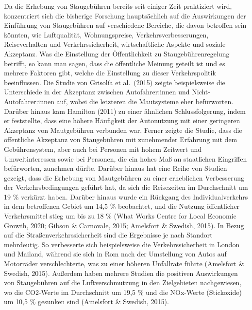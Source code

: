 \documentclass[
]{book}
\begin{document}
Da die Erhebung von Staugebühren bereits seit einiger Zeit praktiziert wird, konzentriert sich die bisherige Forschung hauptsächlich auf die Auswirkungen der Einführung von Staugebühren auf verschiedene Bereiche, die davon betroffen sein könnten, wie Luftqualität, Wohnungspreise, Verkehrsverbesserungen, Reiseverhalten und Verkehrssicherheit, wirtschaftliche Aspekte und soziale Akzeptanz.
Was die Einstellung der Öffentlichkeit zu Staugebührenregelung betrifft, so kann man sagen, dass die öffentliche Meinung geteilt ist und es mehrere Faktoren gibt, welche die Einstellung zu dieser Verkehrspolitik beeinflussen. Die Studie von Grisolía et al.~(2015) zeigte beispielsweise die Unterschiede in der Akzeptanz zwischen Autofahrer:innen und Nicht-Autofahrer:innen auf, wobei die letzteren die Mautsysteme eher befürworten. Darüber hinaus kam Hamilton (2011) zu einer ähnlichen Schlussfolgerung, indem er feststellte, dass eine höhere Häufigkeit der Autonutzung mit einer geringeren Akzeptanz von Mautgebühren verbunden war. Ferner zeigte die Studie, dass die öffentliche Akzeptanz von Staugebühren mit zunehmender Erfahrung mit dem Gebührensystem, aber auch bei Personen mit hohem Zeitwert und Umweltinteressen sowie bei Personen, die ein hohes Maß an staatlichen Eingriffen befürworten, zunehmen dürfte.
Darüber hinaus hat eine Reihe von Studien gezeigt, dass die Erhebung von Mautgebühren zu einer erheblichen Verbesserung der Verkehrsbedingungen geführt hat, da sich die Reisezeiten im Durchschnitt um 19 \% verkürzt haben. Darüber hinaus wurde ein Rückgang des Individualverkehrs in dem betroffenen Gebiet um 14,5 \% beobachtet, und die Nutzung öffentlicher Verkehrsmittel stieg um bis zu 18 \% (What Works Centre for Local Economic Growth, 2020; Gibson \& Carnovale, 2015; Amelsfort \& Swedish, 2015).
In Bezug auf die Straßenverkehrssicherheit sind die Ergebnisse je nach Standort mehrdeutig. So verbesserte sich beispielsweise die Verkehrssicherheit in London und Mailand, während sie sich in Rom nach der Umstellung von Autos auf Motorräder verschlechterte, was zu einer höheren Unfallrate führte (Amelsfort \& Swedish, 2015).
Außerdem haben mehrere Studien die positiven Auswirkungen von Staugebühren auf die Luftverschmutzung in den Zielgebieten nachgewiesen, wo die CO2-Werte im Durchschnitt um 19,5 \% und die NOx-Werte (Stickoxide) um 10,5 \% gesunken sind (Amelsfort \& Swedish, 2015).
\end{document}
